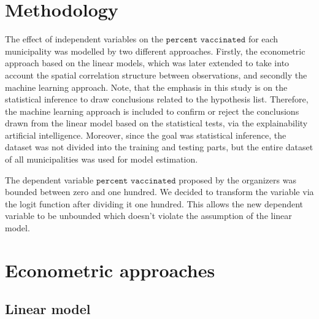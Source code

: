\documentclass[a4paper,12pt]{article} %
\begin{document}
\newpage
\section{Methodology}
The effect of independent variables on the $\texttt{percent\ vaccinated}$ for each municipality was modelled by two different approaches. Firstly, the econometric approach based on the linear models, which was later extended to take into account the spatial correlation structure between observations, and secondly the machine learning approach. Note, that the emphasis in this study is on the statistical inference to draw conclusions related to the hypothesis list. Therefore, the machine learning approach is included to confirm or reject the conclusions drawn from the linear model based on the statistical tests, via the explainability artificial intelligence. Moreover, since the goal was statistical inference, the dataset was not divided into the training and testing parts, but the entire dataset of all municipalities was used for model estimation.

The dependent variable $\texttt{percent\ vaccinated}$ proposed by the organizers was bounded between zero and one hundred. We decided to transform the variable via the logit function after dividing it one hundred. This allows the new dependent variable to be unbounded which doesn't violate the assumption of the linear model.


\section{Econometric approaches}

\subsection{Linear model}
\end{document}

